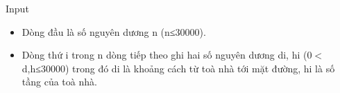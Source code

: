 Input
\begin{itemize}
	\item Dòng đầu là số nguyên dương n (n≤30000).
	\item Dòng thứ i trong n dòng tiếp theo ghi hai số nguyên dương di, hi (0$<$d,h≤30000) trong đó di là khoảng cách từ toà nhà tới mặt đường, hi là số tầng của toà nhà.
\end{itemize}